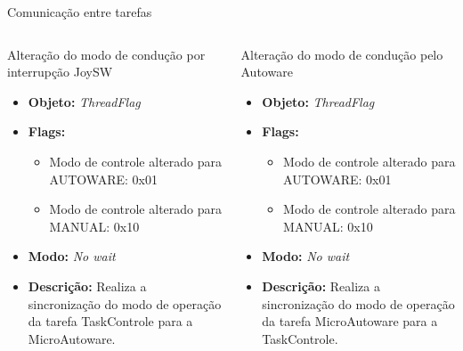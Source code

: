 \documentclass{if-beamer}
\begin{document}
\begin{frame}{Comunicação entre tarefas}

	\begin{columns}
	
	\begin{column}{0.55\textwidth}
		
		\begin{block}{Alteração do modo de condução por interrupção JoySW}
			
			\begin{itemize}
				\item \textbf{Objeto:} \textit{ThreadFlag}
				\item \textbf{Flags:}
				\begin{itemize}
					\item Modo de controle alterado para AUTOWARE: 0x01
					\item Modo de controle alterado para MANUAL: 0x10
					
				\end{itemize}
				\item \textbf{Modo:} \textit{No wait}
				\item \textbf{Descrição:} Realiza a sincronização do modo de operação da tarefa TaskControle para a MicroAutoware.
				
			\end{itemize}
			
		\end{block}
		
	\end{column}
	
	\begin{column}{0.55\textwidth}
		
		\begin{block}{Alteração do modo de condução pelo Autoware}
			
			\begin{itemize}
				\item \textbf{Objeto:} \textit{ThreadFlag}
				\item \textbf{Flags:}
				\begin{itemize}
					\item Modo de controle alterado para AUTOWARE: 0x01
					\item Modo de controle alterado para MANUAL: 0x10
					
				\end{itemize}
				\item \textbf{Modo:} \textit{No wait}
				\item \textbf{Descrição:} Realiza a sincronização do modo de operação da tarefa MicroAutoware para a TaskControle.
				
			\end{itemize}
			
		\end{block}
		
	\end{column}
	
\end{columns}

\end{frame}
\end{document}
